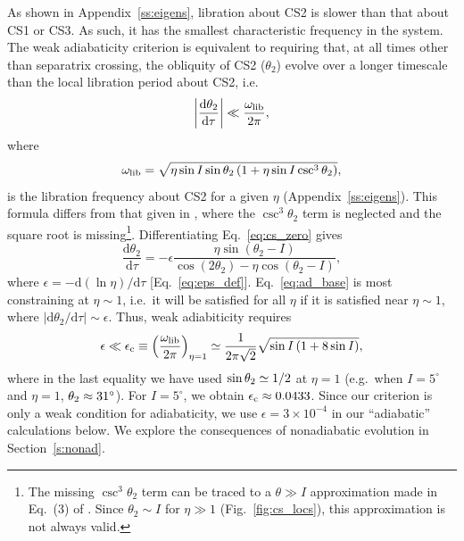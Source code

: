 \documentclass[twocolumn,twocolappendix]{aastex63}
\newcommand*{\rd}[2]{\frac{\mathrm{d}#1}{\mathrm{d}#2}}
\newcommand*{\rdil}[2]{\mathrm{d}#1 / \mathrm{d}#2}
\newcommand*{\abs}[1]{\left|#1\right|}
\newcommand*{\p}[1]{\left(#1\right)}
\begin{document}
As shown in Appendix~\ref{ss:eigens}, libration about CS2 is slower than that
about CS1 or CS3. As such, it has the smallest characteristic frequency in the
system. The weak adiabaticity criterion is equivalent to
requiring that, at all times other than separatrix crossing, the obliquity of
CS2 ($\theta_2$) evolve over a longer timescale than the local libration period
about CS2, i.e.
\begin{equation}
    \abs{\rd{\theta_2}{\tau}} \ll
        \frac{\omega_{\rm lib}}{2\pi},\label{eq:ad_base}
\end{equation}
where
\begin{equation}
    \omega_{\rm lib} = \sqrt{\eta\sin I \sin \theta_2
        \p{1 + \eta \sin I \csc^3 \theta_2}},\label{eq:w_lib}
\end{equation}
is the libration frequency about CS2 for a given $\eta$
(Appendix~\ref{ss:eigens}). This formula differs from that given in
\citet{millholland_disk}, where the $\csc^3\!\theta_2$ term is neglected and the
square root is missing\footnote{The missing $\csc^3\!\theta_2$ term can be
traced to a $\theta \gg I$ approximation made in Eq.~(3) of \citet{ward2004II}.
Since $\theta_2 \sim I$ for $\eta \gg 1$ (Fig.~\ref{fig:cs_locs}), this
approximation is not always valid.}. Differentiating Eq.~\eqref{eq:cs_zero}
gives
\begin{equation}
    \rd{\theta_2}{\tau} = -\epsilon \frac{\eta \sin\p{\theta_2 - I}}{
        \cos\p{2\theta_2} - \eta \cos\p{\theta_2 - I}},\label{eq:dq2dt}
\end{equation}
where $\epsilon = -\rdil{(\ln \eta)}{\tau}$ [Eq.~\eqref{eq:eps_def}].
Eq.~\eqref{eq:ad_base} is most constraining at $\eta \sim 1$, i.e.\ it will be
satisfied for all $\eta$ if it is satisfied near $\eta \sim 1$, where
$\abs{\rdil{\theta_2}{\tau}} \sim \epsilon$. Thus, weak adiabiticity requires
\begin{equation}
    \epsilon \ll \epsilon_{\rm c}
        \equiv \p{\frac{\omega_{\rm lib}}{2\pi}}_{\eta = 1}
            \simeq \frac{1}{2\pi\sqrt{2}}\sqrt{\sin I\p{1 + 8\sin I}},
            \label{eq:ad_constr}
\end{equation}
where in the last equality we have used $\sin \theta_{\rm 2} \simeq 1/2$ at
$\eta = 1$ (e.g.\ when $I = 5^\circ$ and $\eta = 1$, $\theta_{\rm 2} \approx
31^\circ$). For $I = 5^\circ$, we obtain $\epsilon_{\rm c} \approx 0.0433$.
Since our criterion is only a weak condition for adiabaticity, we use $\epsilon
= 3 \times 10^{-4}$ in our ``adiabatic'' calculations below. We explore the
consequences of nonadiabatic evolution in Section~\ref{s:nonad}.
\end{document}
